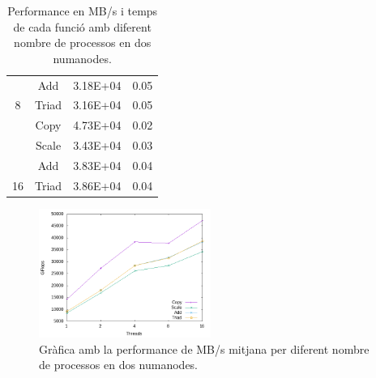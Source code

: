 \begin{table}[h]
\begin{tabular}{cccc}
                     & \cellcolor[HTML]{EFEFEF}Add  & \cellcolor[HTML]{EFEFEF}3.18E+04 & \cellcolor[HTML]{EFEFEF}0.05 \\
\multirow{-4}{*}{8}  & Triad                        & 3.16E+04                         & 0.05                         \\ \hline
                     & \cellcolor[HTML]{EFEFEF}Copy & \cellcolor[HTML]{EFEFEF}4.73E+04 & \cellcolor[HTML]{EFEFEF}0.02 \\
                     & Scale                        & 3.43E+04                         & 0.03                         \\
                     & \cellcolor[HTML]{EFEFEF}Add  & \cellcolor[HTML]{EFEFEF}3.83E+04 & \cellcolor[HTML]{EFEFEF}0.04 \\
\multirow{-4}{*}{16} & Triad                        & 3.86E+04                         & 0.04                         \\ \hline
\end{tabular}
    \caption{Performance en MB/s i temps de cada funció amb diferent nombre de processos en dos numanodes.}
    \label{tab:stream_binding_two_perf}
\end{table}


\begin{figure}
    \centering
    \includegraphics[width=0.5\textwidth]{img/stream_binding_two_same_grafica.png}
    \caption{Gràfica amb la performance de MB/s mitjana per diferent nombre de processos en dos numanodes.}
    \label{fig:stream_binding_two_perf}
\end{figure}
